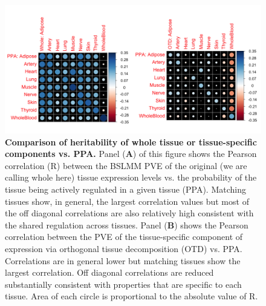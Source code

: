 \documentclass[10pt,letterpaper]{article}
\begin{document}



\begin{figure}[H]
\includegraphics[width=12cm]{Figures/Fig-cor-StephensPr-v-PVE.png}
\caption{{\bf Comparison of heritability of whole tissue or tissue-specific components vs. PPA.} 
Panel (\textbf{A}) of this figure shows the Pearson correlation (R) between the BSLMM PVE of the original (we are calling whole here) tissue expression levels vs. the probability of the tissue being actively regulated in a given tissue (PPA). Matching tissues show, in general, the largest correlation values but most of the off diagonal correlations are also relatively high consistent with the shared regulation across tissues. 
Panel (\textbf{B}) shows the Pearson correlation between the PVE of the tissue-specific component of expression via orthogonal tissue decomposition (OTD) vs. PPA. Correlations are in general lower but matching tissues show the largest correlation. Off diagonal correlations are reduced substantially consistent with properties that are specific to each tissue. 
Area of each circle is proportional to the absolute value of R.
}
\label{fig-corrplot}
\end{figure}
\end{document}
